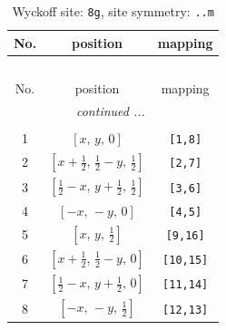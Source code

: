 \documentclass[fleqn,8pt]{jsarticle}
\begin{document}
\begin{longtable}{ccc}
\caption{Wyckoff site: {\tt 8g}, site symmetry: {\tt ..m}}
 \\
 \hline \hline
No. & position & mapping \\ \hline \endfirsthead

\multicolumn{2}{l}{\tablename\ \thetable{}} \\
 \hline \hline
No. & position & mapping \\ \hline \endhead

 \hline \hline
\multicolumn{2}{r}{\footnotesize\it continued ...} \\ \endfoot

 \hline \hline
\multicolumn{2}{r}{} \\ \endlastfoot

1 & $\left[ x,\, y,\, 0 \right]$ & {\tt [1,8]} \\ \hline
2 & $\left[ x + \frac{1}{2},\, \frac{1}{2} - y,\, \frac{1}{2} \right]$ & {\tt [2,7]} \\ \hline
3 & $\left[ \frac{1}{2} - x,\, y + \frac{1}{2},\, \frac{1}{2} \right]$ & {\tt [3,6]} \\ \hline
4 & $\left[ - x,\, - y,\, 0 \right]$ & {\tt [4,5]} \\ \hline
5 & $\left[ x,\, y,\, \frac{1}{2} \right]$ & {\tt [9,16]} \\ \hline
6 & $\left[ x + \frac{1}{2},\, \frac{1}{2} - y,\, 0 \right]$ & {\tt [10,15]} \\ \hline
7 & $\left[ \frac{1}{2} - x,\, y + \frac{1}{2},\, 0 \right]$ & {\tt [11,14]} \\ \hline
8 & $\left[ - x,\, - y,\, \frac{1}{2} \right]$ & {\tt [12,13]} \\
\end{longtable}
\renewcommand{\arraystretch}{1.2}
\end{document}
